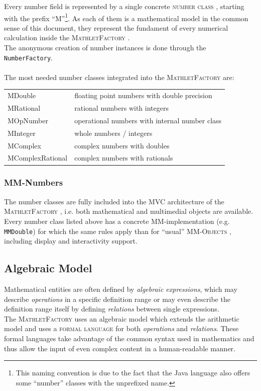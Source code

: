 \documentclass[a4paper,12pt]{article}
\newcommand{\name}[1]{\textsc{#1}}
\newcommand{\codename}[1]{\texttt{\small #1}}
\newcommand{\mf}{\name{MathletFactory }}
\newcommand{\nc}{\name{number class }}
\newcommand{\mmos}{\name{MM-Objects }}
\newcommand{\formlang}{\name{formal language }}
\begin{document}
Every number field is represented by a single concrete \nc, starting with the prefix ``M''\footnote{This 
naming convention is due to the fact that the Java language also offers some ``number'' classes with 
the unprefixed name.}. As each of them is a mathematical model in the common sense of this document,
they represent the fundament of every numerical calculation inside the \mf.\\
The anonymous creation of number instances is done through the \codename{NumberFactory}.\\
\\
The most needed number classes integrated into the \mf are:\\
\begin{tabular}{ll}
  MDouble & floating point numbers with double precision \\
  MRational & rational numbers with integers \\
  MOpNumber & operational numbers with internal number class \\
  MInteger & whole numbers / integers \\
  MComplex & complex numbers with doubles \\
  MComplexRational & complex numbers with rationals
\end{tabular}

\subsubsection*{MM-Numbers}

The number classes are fully included into the MVC architecture of the \mf, i.e. both mathematical and
multimedial objects are available.\\
Every number class listed above has a concrete MM-implementation (e.g. \codename{MMDouble}) for which the same
rules apply than for ``usual'' \mmos, including display and interactivity support.


\newpage

\subsection{Algebraic Model}

Mathematical entities are often defined by \textit{algebraic expressions}, which may describe 
\textit{operations} in a specific definition range or may even describe the definition range itself 
by defining \textit{relations} between single expressions.\\
The \mf uses an algebraic model which extends the arithmetic model and uses a \formlang
for both \textit{operations} and \textit{relations}. These formal languages take advantage of the
common syntax used in mathematics and thus allow the input of even complex content in a human-readable
manner.
\end{document}

